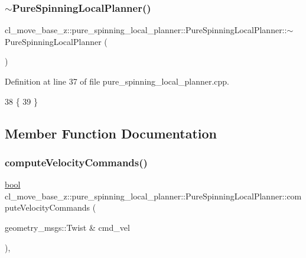 \subsubsection{\texorpdfstring{$\sim$\+Pure\+Spinning\+Local\+Planner()}{~PureSpinningLocalPlanner()}}
{\footnotesize\ttfamily cl\+\_\+move\+\_\+base\+\_\+z\+::pure\+\_\+spinning\+\_\+local\+\_\+planner\+::\+Pure\+Spinning\+Local\+Planner\+::$\sim$\+Pure\+Spinning\+Local\+Planner (\begin{DoxyParamCaption}{ }\end{DoxyParamCaption})\hspace{0.3cm}{\ttfamily [virtual]}}



Definition at line 37 of file pure\+\_\+spinning\+\_\+local\+\_\+planner.\+cpp.


\begin{DoxyCode}
38 \{
39 \}
\end{DoxyCode}


\subsection{Member Function Documentation}
\mbox{\label{classcl__move__base__z_1_1pure__spinning__local__planner_1_1PureSpinningLocalPlanner_af7dfee89a0a6c54569b5fd262ccbd4f0}} 
\subsubsection{\texorpdfstring{compute\+Velocity\+Commands()}{computeVelocityCommands()}}
{\footnotesize\ttfamily \hyperlink{classbool}{bool} cl\+\_\+move\+\_\+base\+\_\+z\+::pure\+\_\+spinning\+\_\+local\+\_\+planner\+::\+Pure\+Spinning\+Local\+Planner\+::compute\+Velocity\+Commands (\begin{DoxyParamCaption}\item[{geometry\+\_\+msgs\+::\+Twist \&}]{cmd\+\_\+vel }\end{DoxyParamCaption})\hspace{0.3cm}{\ttfamily [override]}, {\ttfamily [virtual]}}



